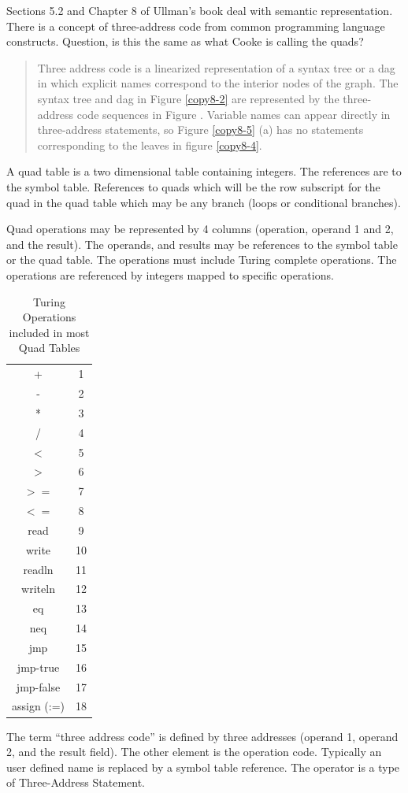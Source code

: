 \documentclass[11pt]{article}
\begin{document}
 Sections 5.2 and Chapter 8 of Ullman's book deal with semantic representation.  There is a concept of three-address code from common programming language constructs.  Question, is this the same as what Cooke is calling the quads?  
 
 
 \begin{quote}
 Three address code is a linearized representation of a syntax tree or a dag in which explicit names correspond to the interior nodes of the graph.  The syntax tree and dag in Figure \ref{copy8-2} are represented by the three-address code sequences  in Figure \cite{copy8-5}.  Variable names can appear directly in three-address statements, so Figure \ref{copy8-5} (a)  has no statements corresponding to the leaves in figure \ref{copy8-4}.  
 \end{quote}
 
 A quad table is a two dimensional table containing integers.  The references are to the symbol table.     References to quads which will be the row subscript for the quad in the quad table which may be any branch (loops or conditional branches).  

Quad operations may be represented by 4 columns (operation, operand 1 and 2, and the result).  The operands, and results may be references to the symbol table or the quad table.   The operations must include Turing complete operations.  The operations are referenced by integers mapped to specific operations.   
 
\begin{table}[htdp]
\caption{Turing Operations included in most Quad Tables}
\begin{center}
\begin{tabular}{|c|c|}
+ 	& 1 \\
-	& 2 \\
*	& 3 \\
/	& 4 \\
$<$ 	& 5 \\
$>$ 	& 6  \\
$>=$	& 7	\\
$<=$ 	& 8 	\\
read	&	9	\\
write	&	10	\\
readln	&	11 \\
writeln	&	12 \\
eq		&	13	\\
neq		&	14	\\
jmp		& 	15	\\
jmp-true	&	16	\\
jmp-false	&	17	\\
assign (:=)	&	18	\\
\end{tabular}
\end{center}
\label{default}
\end{table}%
 \newpage
 The term ``three address code'' is defined by three addresses (operand 1, operand 2, and the result field).  The other element is the operation code.  Typically an user defined name is replaced by a symbol table reference.   The operator is a type of Three-Address Statement.
 
\end{document}
